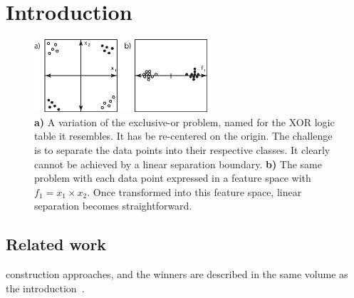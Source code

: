 \section{Introduction}
\begin{figure}
\centering
\includegraphics[height=2.7cm]{figs/xor.eps}
\caption{{\bf a)} A variation of the exclusive-or problem, named for the XOR logic table it resembles. It has be re-centered on the origin. The challenge is to separate the data points into their respective classes. It clearly cannot be achieved by a linear separation boundary. {\bf b)} The same problem with each data point expressed in a feature space with $f_1 = x_1 \times x_2$. Once transformed into this feature space, linear separation becomes straightforward.}
\label{xor}
\end{figure}

\subsection{Related work}
construction approaches, and the winners are described in the same volume as the introduction~\cite[e.g.]{torkkola03}.

\newcommand{\colwid}{6.0cm}
\newcommand{\algtab}{\hspace{0.6cm}}

